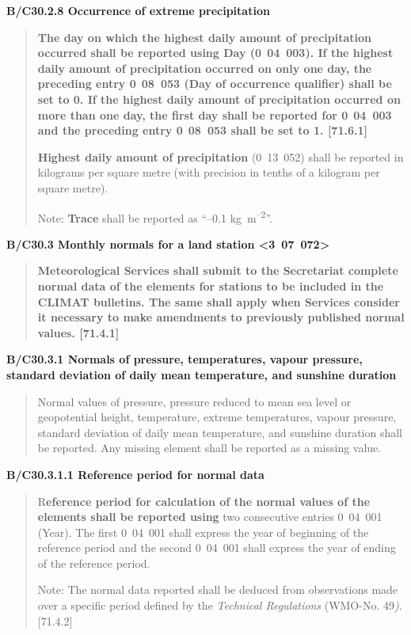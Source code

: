 \textbf{B/C30.2.8 Occurrence of extreme precipitation}

\begin{quote}
\textbf{The day on which the highest daily amount of precipitation occurred shall be reported using Day (0}~\textbf{04~003). If the highest daily amount of precipitation occurred on only one day, the preceding entry 0}~\textbf{08~053 (Day of occurrence qualifier) shall be set to 0. If the highest daily amount of precipitation occurred on more than one day, the first day shall be reported for 0}~\textbf{04~003 and the preceding entry 0}~\textbf{08~053 shall be set to 1. {[}71.6.1{]}}

\textbf{Highest daily amount of precipitation} (0~13~052) shall be reported in kilograms per square metre (with precision in tenths of a kilogram per square metre).

Note: \textbf{Trace} shall be reported as ``--0.1 kg~m\textsuperscript{--2}''.
\end{quote}

\textbf{B/C30.3 Monthly normals for a land station \textless3~07~072\textgreater{}}

\begin{quote}
\textbf{Meteorological Services shall submit to the Secretariat complete normal data of the elements for stations to be included in the CLIMAT bulletins. The same shall apply when Services consider it necessary to make amendments to previously published normal values. {[}71.4.1{]}}
\end{quote}

\textbf{B/C30.3.1 Normals of pressure, temperatures, vapour pressure, standard deviation of daily mean temperature, and sunshine duration}

\begin{quote}
Normal values of pressure, pressure reduced to mean sea level or geopotential height, temperature, extreme temperatures, vapour pressure, standard deviation of daily mean temperature, and sunshine duration shall be reported. Any missing element shall be reported as a missing value.
\end{quote}

\textbf{B/C30.3.1.1 Reference period for normal data}

\begin{quote}
R\textbf{eference period for calculation of the normal values of the elements shall be reported using} two consecutive entries 0~04~001 (Year). The first 0~04~001 shall express the year of beginning of the reference period and the second 0~04~001 shall express the year of ending of the reference period.

Note: The normal data reported shall be deduced from observations made over a specific period defined by the \emph{Technical Regulations} (WMO-No. 49\emph{)}. {[}71.4.2{]}
\end{quote}

